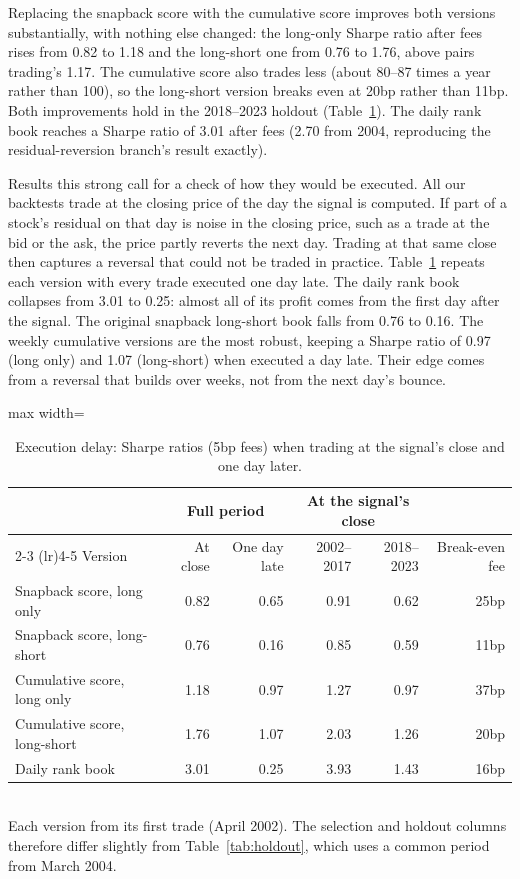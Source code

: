 \documentclass[11pt,letterpaper]{article}
\begin{document}
Replacing the snapback score with the cumulative score improves both versions substantially,
with nothing else changed: the long-only Sharpe ratio after fees rises from 0.82 to 1.18 and
the long-short one from 0.76 to 1.76, above pairs trading's 1.17. The cumulative score also
trades less (about 80--87 times a year rather than 100), so the long-short version breaks
even at 20bp rather than 11bp. Both improvements hold in the 2018--2023 holdout
(Table~\ref{tab:delay}). The daily rank book reaches a Sharpe ratio of 3.01 after fees (2.70
from 2004, reproducing the residual-reversion branch's result exactly).

Results this strong call for a check of how they would be executed. All our backtests trade
at the closing price of the day the signal is computed. If part of a stock's residual on
that day is noise in the closing price, such as a trade at the bid or the ask, the price
partly reverts the next day. Trading at that same close then captures a reversal that could
not be traded in practice. Table~\ref{tab:delay} repeats each version with every trade
executed one day late. The daily rank book collapses from 3.01 to 0.25: almost all of its
profit comes from the first day after the signal. The original snapback long-short book
falls from 0.76 to 0.16. The weekly cumulative versions are the most robust, keeping a
Sharpe ratio of 0.97 (long only) and 1.07 (long-short) when executed a day late. Their edge
comes from a reversal that builds over weeks, not from the next day's bounce.

\begin{table}[!htbp]
    \centering
    \caption{Execution delay: Sharpe ratios (5bp fees) when trading at the signal's close and
    one day later.}
    \label{tab:delay}
    \begin{adjustbox}{max width=\linewidth}
        \begin{tabular}{lrrrrr}
            \toprule
            & \multicolumn{2}{c}{Full period} & \multicolumn{2}{c}{At the signal's close} & \\
            \cmidrule(lr){2-3} \cmidrule(lr){4-5}
            Version & At close & One day late & 2002--2017 & 2018--2023 & Break-even fee \\
            \midrule
            Snapback score, long only & 0.82 & 0.65 & 0.91 & 0.62 & 25bp \\
            Snapback score, long-short & 0.76 & 0.16 & 0.85 & 0.59 & 11bp \\
            Cumulative score, long only & 1.18 & 0.97 & 1.27 & 0.97 & 37bp \\
            Cumulative score, long-short & 1.76 & 1.07 & 2.03 & 1.26 & 20bp \\
            Daily rank book & 3.01 & 0.25 & 3.93 & 1.43 & 16bp \\
            \bottomrule
        \end{tabular}
    \end{adjustbox}
    \\[4pt]
    \small Each version from its first trade (April 2002). The selection and holdout columns
    therefore differ slightly from Table~\ref{tab:holdout}, which uses a common period from
    March 2004.
\end{table}
\end{document}
